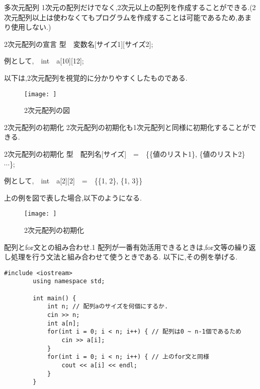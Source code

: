 \documentclass[xdvipdfmx, 8pt, t]{beamer}
\begin{document}
\begin{frame}{多次元配列}
    1次元の配列だけでなく,2次元以上の配列を作成することができる.(2次元配列以上は使わなくてもプログラムを作成することは可能であるため,あまり使用しない.)
    \begin{block}{2次元配列の宣言}
        型　変数名[サイズ1][サイズ2];
        
        例として,　int　a[10][12];
    \end{block}
    以下は,2次元配列を視覚的に分かりやすくしたものである.
    \begin{figure}[h]
        \centering
        \texttt{[image: ]}
        \caption{2次元配列の図}
        \label{fig:enter-label}
    \end{figure}
\end{frame}

\begin{frame}{2次元配列の初期化}
    2次元配列の初期化も1次元配列と同様に初期化することができる.
    \begin{block}{2次元配列の初期化}
        型　配列名[サイズ]　=　\{\{値のリスト1\}, \{値のリスト2\}　$\cdots$\};
        
        例として,　int　a[2][2]　=　\{\{1, 2\}, \{1, 3\}\}

    \end{block}
    
    上の例を図で表した場合,以下のようになる.
    \begin{figure}[h]
        \centering
        \texttt{[image: ]}
        \caption{2次元配列の初期化}
        \label{fig:enter-label}
    \end{figure}    

\end{frame}

\begin{frame}[fragile]{配列とfor文との組み合わせ.1}
    配列が一番有効活用できるときは,for文等の繰り返し処理を行う文法と組み合わせて使うときである.
    以下に,その例を挙げる.
    \begin{lstlisting}[caption=配列とfor文の組み合わせ,label=arr]
        #include <iostream>
        using namespace std;

        int main() {
            int n; // 配列aのサイズを何個にするか.
            cin >> n;
            int a[n];
            for(int i = 0; i < n; i++) { // 配列は0 ~ n-1個であるため
                cin >> a[i];
            }
            for(int i = 0; i < n; i++) { // 上のfor文と同様
                cout << a[i] << endl;
            }
        }
    \end{lstlisting}
\end{frame}
\end{document}
